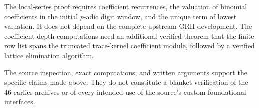 The local-series proof requires coefficient recurrences, the valuation
of binomial coefficients in the initial \(p\)-adic digit window, and the
unique term of lowest valuation. It does not depend on the complete
upstream GRH development. The coefficient-depth computations need an
additional verified theorem that the finite row list spans the truncated
trace-kernel coefficient module, followed by a verified lattice
elimination algorithm.

The source inspection, exact computations, and written arguments support
the specific claims made above. They do not constitute a blanket
verification of the 46 earlier archives or of every intended use of
the source's custom foundational interfaces.
